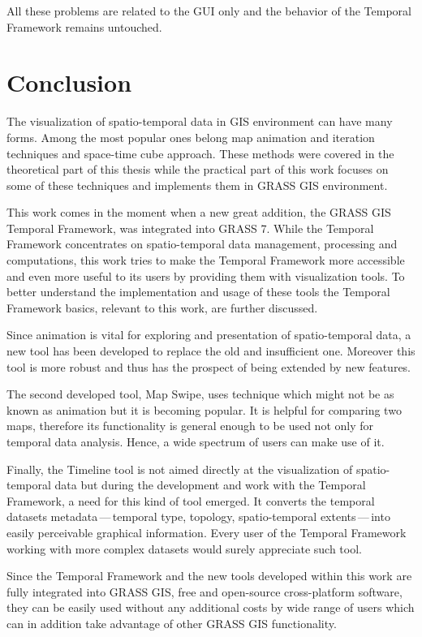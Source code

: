\documentclass[a4paper,12pt,oneside]{book}
\newcommand{\tf}{Temporal Framework\xspace}
\newcommand{\ms}{Map Swipe\xspace}
\newcommand{\dash}{\mbox{\,---\,}}
\begin{document}
All these problems are related to the GUI only and the behavior of the \tf
remains untouched.

\cleardoublepage

\chapter*{Conclusion}

The visualization of spatio-temporal data in GIS environment can have many forms.
Among the most popular ones belong map animation and iteration techniques and space-time cube approach.
These methods were covered in the theoretical part of this thesis
while the practical part of this work focuses on some of these techniques
and implements them in GRASS GIS environment.

This work comes in the moment when a new great addition, the GRASS GIS \tf, was integrated into GRASS 7.
While the \tf concentrates on spatio-temporal data management, processing and computations, this work
tries to make the \tf more accessible and even more useful to its users by providing them with visualization
tools. To better understand the implementation and usage of these tools
the \tf basics, relevant to this work, are further discussed.

Since animation is vital for exploring and presentation of spatio-temporal data, a new tool has been developed
to replace the old and insufficient one. Moreover this tool is more robust
and thus has the prospect of being extended by new features.

The second developed tool, \ms, uses technique which might not be as known as animation
but it is becoming popular. It is helpful for comparing two maps, therefore its functionality
is general enough to be used not only for temporal data analysis.
Hence, a wide spectrum of users can make use of it.

Finally, the Timeline tool is not aimed directly at the visualization of spatio-temporal data
but during the development and work with the \tf, a need for this kind of tool emerged.
It converts the temporal datasets metadata\dash temporal type, topology,
spatio-temporal extents\dash into easily perceivable graphical information.
Every user of the \tf working with more complex datasets would surely appreciate such tool.

Since the \tf and the new tools developed within this work are fully integrated into
GRASS GIS, free and open-source cross-platform software, they can be easily used
without any additional costs by wide range of users which can in addition take advantage
of other GRASS GIS functionality.
\end{document}
